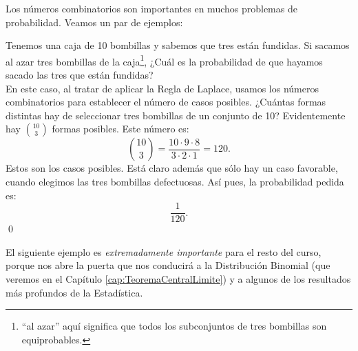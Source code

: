 Los números combinatorios son importantes en muchos problemas de probabilidad. Veamos un par de ejemplos:
    \begin{Ejemplo}
    \label{cap03:ejem:BombillasDefectuosas}
    Tenemos una caja de 10 bombillas y sabemos que tres están fundidas. Si sacamos al azar tres bombillas de la caja\footnote{``al azar'' aquí significa que todos los subconjuntos de tres bombillas son equiprobables.}, ¿Cuál es la probabilidad de que hayamos sacado las tres que están fundidas?\\[2mm]
    En este caso, al tratar de aplicar la Regla de Laplace, usamos los números combinatorios para establecer el número de casos posibles. ¿Cuántas formas distintas hay de seleccionar tres bombillas de un conjunto de 10? Evidentemente hay $\binom{10}{3}$ formas posibles. Este número es:
    \[\binom{10}{3}=\dfrac{10\cdot 9\cdot 8}{3\cdot 2\cdot 1}=120.\]
    Estos son los casos posibles. Está claro además que sólo hay un caso favorable, cuando elegimos las tres bombillas defectuosas. Así pues, la probabilidad pedida es:
    \[\dfrac{1}{120}.\]
    \qed
    \end{Ejemplo}
El siguiente ejemplo es {\sf\em extremadamente importante} para el resto del curso, porque nos abre la puerta que nos conducirá a la Distribución Binomial (que veremos en el Capítulo \ref{cap:TeoremaCentralLimite}) y a algunos de los resultados más profundos de la Estadística.
